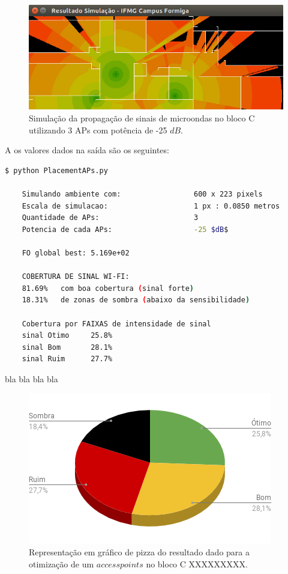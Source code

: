 \documentclass[
	12pt,				%
	twoside,			%
	a4paper,			%
	english,			%
	french,				%
	spanish,			%
	brazil				%
	]{abntex2}
\begin{document}
\begin{figure}[ht]
    \caption{\label{captura_3_aps_bloco_c} Simulação da propagação de sinais de microondas no bloco C utilizando 3 APs com potência de -25 $dB$.
    }
    \begin{center}
        \includegraphics[scale=0.7]{imagens/captura-3-aps-bloco-c.jpg}
    \end{center}
\end{figure}

A os valores dados na saída são os seguintes:

\begin{lstlisting}[language=bash]
    $ python PlacementAPs.py 
    
    Simulando ambiente com:                 600 x 223 pixels
    Escala de simulacao:                    1 px : 0.0850 metros
    Quantidade de APs:                      3
    Potencia de cada APs:                   -25 $dB$
    
    FO global best: 5.169e+02
    
    COBERTURA DE SINAL WI-FI:
    81.69%   com boa cobertura (sinal forte)
    18.31%   de zonas de sombra (abaixo da sensibilidade)
    
    Cobertura por FAIXAS de intensidade de sinal
    sinal Otimo     25.8%
    sinal Bom       28.1%
    sinal Ruim      27.7%
\end{lstlisting}

bla bla bla bla

\begin{figure}[ht]
    \caption{\label{percent_bloco_c_3} Representação em gráfico de pizza do resultado dado para a otimização 
     de um $access points$ no bloco C XXXXXXXXX.}
    \begin{center}
        \includegraphics[scale=0.7]{imagens/percent-bloco-c-3.png}
    \end{center}
\end{figure}
\end{document}
